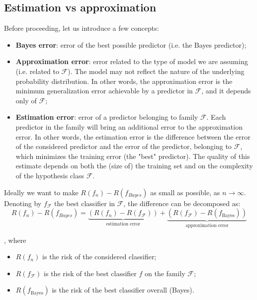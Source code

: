 \subsection{Estimation vs approximation}
Before proceeding, let us introduce a few concepts:
\begin{itemize}
	\item \textbf{Bayes error}: error of the best possible predictor (i.e. the Bayes predictor);
	\item \textbf{Approximation error}: error related to the type of model we are assuming (i.e. related to $\mathcal{F}$). The model may not reflect the nature of the underlying probability distribution. In other words, the approximation error is the minimum generalization error achievable by a predictor in $\mathcal{F}$, and it depends only of $\mathcal{F}$;
	\item \textbf{Estimation error}: error of a predictor belonging to family $\mathcal{F}$. Each predictor in the family will bring an additional error to the approximation error. In other words, the estimation error is the difference between the error of the considered predictor and the error of the predictor, belonging to $\mathcal{F}$, which minimizes the training error (the "best" predictor). The quality of this estimate depends on both the (size of) the training set and on the complexity of the hypothesis class $\mathcal{F}$.
\end{itemize}

Ideally we want to make $R(f_n) - R(f_{Bayes})$ as small as possible, as $n \rightarrow \infty$. Denoting by $f_{\mathcal{ F }}$ the best classifier in $\mathcal{ F }$, the difference can be decomposed as:
$$R \left( f _ { n } \right) - R \left( f _ { B a y e s } \right) = \underbrace{\left( R \left( f _ { n } \right) - R \left( f _ { \mathcal { F } } \right) \right)}_{\text{estimation error}} + \underbrace{\left( R \left( f _ { \mathcal { F } } \right) - R \left( f _ { \text {Bayes} } \right) \right)}_{\text{approximation error}}$$

, where

\begin{itemize}
	\item $R(f_n)$ is the risk of the considered classifier;
	\item $R(f_\mathcal{ F })$ is the risk of the best classifier $f$ on the family $\mathcal{ F }$;
	\item $R \left( f _ { \text {Bayes} } \right)$ is the risk of the best classifier overall (Bayes).
\end{itemize}


